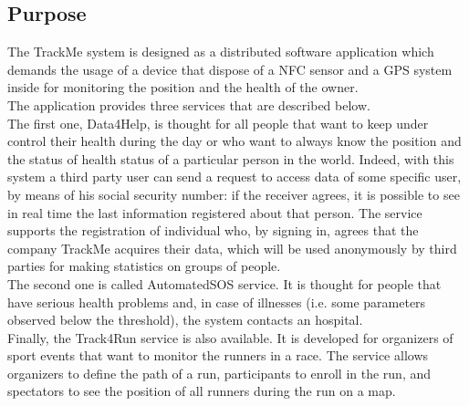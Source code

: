 \subsection{Purpose}
\par
The TrackMe system is designed as a distributed software application which demands the usage of a device that dispose of a NFC sensor and a GPS system inside for monitoring the position and the health of the owner. \\
The application provides three services that are described below. \\
The first one, Data4Help, is thought for all people that want to keep under control their health during the day or who want to always know the position and the status of health status of a particular person in the world. Indeed, with this system a third party user can send a request to access data of some specific user, by means of his social security number: if the receiver agrees, it is possible to see in real time the last information registered about that person. The service supports the registration of individual who, by signing in, agrees that the company TrackMe acquires their data, which will be used anonymously by third parties for making statistics on groups of people. \\
The second one is called AutomatedSOS service. It is thought for people that have serious health problems and, in case of illnesses (i.e. some parameters observed below the threshold), the system contacts an hospital. \\
Finally, the Track4Run service is also available. 
It is developed for organizers of sport events that want to monitor the runners in a race. The service allows organizers to define the path of a run, participants to enroll in the run, and spectators to see the position of all runners during the run on a map. \\

